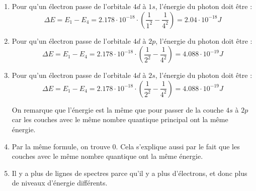 \documentclass{article}
\begin{document}
\begin{enumerate}
	\item Pour qu'un électron passe de l'orbitale $4d$ à $1s$, l'énergie du photon doit être :
				$$\Delta E = E_1 - E_4 = 2.178 \cdot 10^{-18} \cdot (\frac{1}{1^2} - \frac{1}{4^2}) = 2.04 
				\cdot 10^{-18} J$$
	\item	Pour qu'un électron passe de l'orbitale $4d$ à $2p$, l'énergie du photon doit être :
				$$\Delta E = E_1 - E_4 = 2.178 \cdot 10^{-18} \cdot (\frac{1}{2^2} - \frac{1}{4^2}) = 4.088 
				\cdot 10^{-19} J$$
	\item Pour qu'un électron passe de l'orbitale $4d$ à $2s$, l'énergie du photon doit être :
				$$\Delta E = E_1 - E_4 = 2.178 \cdot 10^{-18} \cdot (\frac{1}{2^2} - \frac{1}{4^2}) = 4.088 
				\cdot 10^{-19} J$$
				
				On remarque que l'énergie est la même que pour passer de la couche $4s$ à $2p$ car les couches
				avec le même nombre quantique principal ont la même énergie.
	\item	Par la même formule, on trouve 0. Cela s'explique aussi par le fait que les couches avec le même 
				nombre quantique ont la même énergie.
	\item Il y a plus de lignes de spectres parce qu'il y a plus d'électrons, et donc plus de niveaux d'énergie différents.
\end{enumerate}
\end{document}
